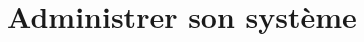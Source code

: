 \documentclass[french]{beamer}
\begin{document}




\section{Administrer son système}
\frame{\tableofcontents[current]}
\end{document}
